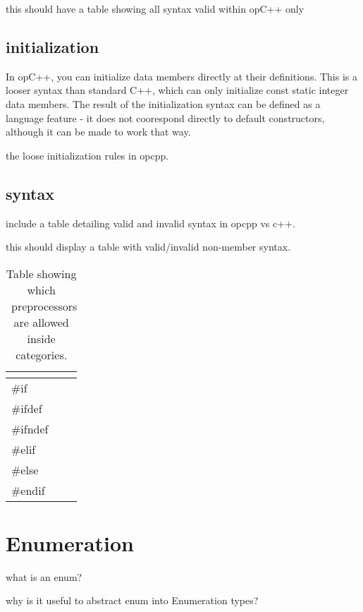 this should have a table showing all syntax valid within opC++ only


\subsection{ initialization }
\label{sec:concepts_initialization}

In opC++, you can initialize data members directly at their definitions.
This is a looser syntax than standard C++, which can only initialize const
static integer data members.  The result of the initialization syntax can
be defined as a language feature - it does not coorespond directly to
default constructors, although it can be made to work that way.

the loose initialization rules in opcpp.

\subsection{ syntax }
\label{sec:concepts_syntax}

include a table detailing valid and invalid syntax
in opcpp vs c++.

this should display a table with valid/invalid non-member syntax.

\begin{table}[htb]
\centering
\begin{tabular}{|l|}
\hline 
\multicolumn{1}{|c|}{\color{blue}{Allowed Category Preprocessors}} \\
\hline 
\#if \\
\#ifdef \\
\#ifndef \\
\#elif \\
\#else \\
\#endif \\
\hline
\end{tabular}
\caption{Table showing which \cpp\ preprocessors are allowed inside categories.}
\label{table:allowed_category_preprocessors}
\end{table}

\section{ Enumeration }
\label{sec:concepts_enumeration}

what is an enum?

why is it useful to abstract enum into Enumeration types?

